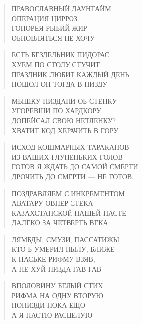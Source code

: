 \poemtitle{***}
\begin{verse}
ПРАВОСЛАВНЫЙ ДАУНТАЙМ\\
ОПЕРАЦИЯ ЦИРРОЗ\\
ГОНОРЕЯ РЫБИЙ ЖИР\\
ОБНОВЛЯТЬСЯ НЕ ХОЧУ
\end{verse}

\poemtitle{***}
\begin{verse}
ЕСТЬ БЕЗДЕЛЬНИК ПИДОРАС\\
ХУЕМ ПО СТОЛУ СТУЧИТ\\
ПРАЗДНИК ЛЮБИТ КАЖДЫЙ ДЕНЬ\\
ПОШОЛ ОН ТОГДА В ПИЗДУ
\end{verse}

\poemtitle{***}
\begin{verse}
МЫШКУ ПИЗДАНИ ОБ СТЕНКУ\\
УГОРЕВШИ ПО ХАРДКОРУ\\
ДОПЕЙСАЛ СВОЮ НЕТЛЕНКУ?\\
ХВАТИТ КОД ХЕРАЧИТЬ В ГОРУ
\end{verse}

\poemtitle{***}
\begin{verse}
ИСХОД КОШМАРНЫХ ТАРАКАНОВ\\
ИЗ ВАШИХ ГЛУПЕНЬКИХ ГОЛОВ\\
ГОТОВ Я ЖДАТЬ ДО САМОЙ СМЕРТИ\\
ДРОЧИТЬ ДО СМЕРТИ — НЕ ГОТОВ.
\end{verse}

\poemtitle{***}
\begin{verse}
ПОЗДРАВЛЯЕМ С ИНКРЕМЕНТОМ\\
АВАТАРУ ОВНЕР-СТЕКА\\
КАЗАХСТАНСКОЙ НАШЕЙ НАСТЕ\\
ДАЛЕКО ЗА ЧЕТВЕРТЬ ВЕКА
\end{verse}

\poemtitle{***}
\begin{verse}
ЛЯМБДЫ, СМУЗИ, ПАССАТИЖЫ\\
КТО Б УМЕРИЛ ПЫЛУ, БЛИЖЕ \\
К НАСЬКЕ РИФМУ ВЗЯВ,\\
А НЕ ХУ⁠Й-ПИ⁠ЗДА-ГАВ-ГАВ
\end{verse}

\poemtitle{***}
\begin{verse}
ВПОЛОВИНУ БЕЛЫЙ СТИХ\\
РИФМА НА ОДНУ ВТОРУЮ\\
ПОПИЗДИ ПОКА ЕЩО\\
А Я НАСТЮ РАСЦЕЛУЮ
\end{verse}

